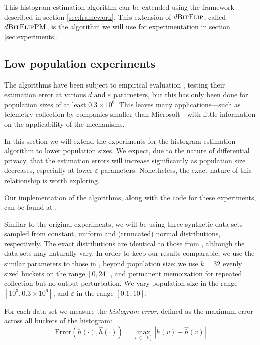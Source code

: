 \documentclass[12pt]{article}
\renewcommand{\epsilon}{\varepsilon}
\begin{document}
This histogram estimation algorithm can be extended using the framework described in section \ref{sec:framework}. This extension of $d\textsc{BitFlip}$, called $d\textsc{BitFlipPM}$, is the algorithm we will use for experimentation in section \ref{sec:experiments}.

\subsection{Low population experiments \label{sec:experiments}}

The algorithms have been subject to empirical evaluation \cite[sec.~5]{microsoft_telemetry}, testing their estimation error at various $d$ and $\epsilon$ parameters, but this has only been done for population sizes of at least $0.3\times 10^6$. This leaves many applications---such as telemetry collection by companies smaller than Microsoft---with little information on the applicability of the mechanisms.

In this section we will extend the experiments for the histogram estimation algorithm to lower population sizes. We expect, due to the nature of differential privacy, that the estimation errors will increase significantly as population size decreases, especially at lower $\epsilon$ parameters. Nonetheless, the exact nature of this relationship is worth exploring. \bigskip

Our implementation of the algorithms, along with the code for these experiments, can be found at \cite{git_repo}.

Similar to the original experiments, we will be using three synthetic data sets sampled from constant, uniform and (truncated) normal distributions, respectively. The exact distributions are identical to those from \cite{microsoft_telemetry}, although the data sets may naturally vary. In order to keep our results comparable, we use the similar parameters to those in \cite{microsoft_telemetry}, beyond population size: we use $k=32$ evenly sized buckets on the range $[0,24]$, and permanent memoization for repeated collection but no output perturbation. We vary population size in the range $[10^3, 0.3 \times 10^6]$, and $\epsilon$ in the range $[0.1, 10]$.

For each data set we measure the \emph{histogram error}, defined as the maximum error across all buckets of the histogram:
\begin{equation*}
    \text{Error}\left(h(\cdot), \hat{h}(\cdot)\right) = \max_{v\in [k]} |h(v) - \hat{h}(v)|
\end{equation*}
\end{document}
